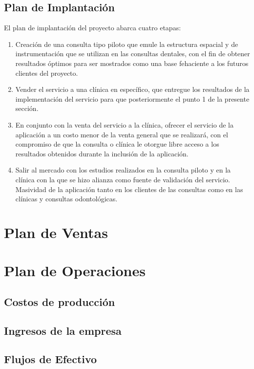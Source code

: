 \documentclass[letterpaper,12pt]{article}
\begin{document}
	\subsection{Plan de Implantación}

El plan de implantación del proyecto abarca cuatro etapas:
		\begin{enumerate}
			\setlength{\itemsep}{0pt}%
			\setlength{\parskip}{0pt}%
			\item Creación de una consulta tipo piloto que emule la estructura espacial y de instrumentación que se utilizan en las consultas dentales, con el fin de obtener resultados óptimos para ser mostrados como una base fehaciente a los futuros clientes del proyecto.
			\item Vender el servicio a una clínica en específico, que entregue los resultados de la implementación del servicio para que posteriormente el punto 1 de la presente sección.
			\item En conjunto con la venta del servicio a la clínica, ofrecer el servicio de la aplicación a un costo menor de la venta general que se realizará, con el compromiso de que la consulta o clínica le otorgue libre acceso a los resultados obtenidos durante la inclusión de la aplicación. 
			\item Salir al mercado con los estudios realizados en la consulta piloto y en la clínica con la que se hizo alianza como fuente de validación del servicio. Masividad de la aplicación tanto en los clientes de las consultas como en las clínicas y consultas odontológicas.
		\end{enumerate}
\newpage
\section{Plan de Ventas}
\newpage
\section{Plan de Operaciones}
	\subsection{Costos de producción}
	\subsection{Ingresos de la empresa}
	\subsection{Flujos de Efectivo}
\end{document}
